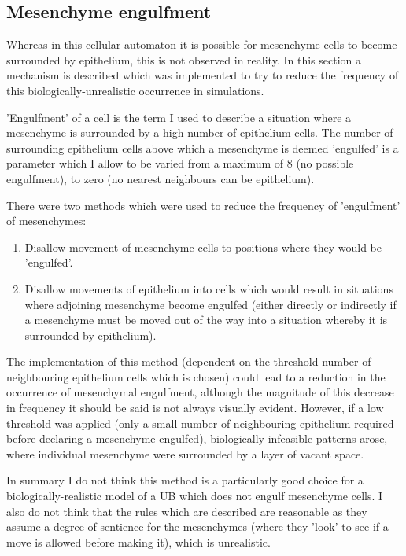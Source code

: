 \documentclass[pdftex,10pt,a4paper]{article}
\begin{document}
\subsection{Mesenchyme engulfment}\label{sec:engulfment}
Whereas in this cellular automaton it is possible for mesenchyme cells to become surrounded by epithelium, this is not observed in reality. In this section a mechanism is described which was implemented to try to reduce the frequency of this biologically-unrealistic occurrence in simulations.

'Engulfment' of a cell is the term I used to describe a situation where a mesenchyme is surrounded by a high number of epithelium cells. The number of surrounding epithelium cells above which a mesenchyme is deemed 'engulfed' is a parameter which I allow to be varied from a maximum of 8 (no possible engulfment), to zero (no nearest neighbours can be epithelium).

There were two methods which were used to reduce the frequency of 'engulfment' of mesenchymes:

\begin{enumerate}
\item Disallow movement of mesenchyme cells to positions where they would be 'engulfed'.
\item Disallow movements of epithelium into cells which would result in situations where adjoining mesenchyme become engulfed (either directly or indirectly if a mesenchyme must be moved out of the way into a situation whereby it is surrounded by epithelium).
\end{enumerate}

The implementation of this method (dependent on the threshold number of neighbouring epithelium cells which is chosen) could lead to a reduction in the occurrence of mesenchymal engulfment, although the magnitude of this decrease in frequency it should be said is not always visually evident. However, if a low threshold was applied (only a small number of neighbouring epithelium required before declaring a mesenchyme engulfed), biologically-infeasible patterns arose, where individual mesenchyme were surrounded by a layer of vacant space.

In summary I do not think this method is a particularly good choice for a biologically-realistic model of a UB which does not engulf mesenchyme cells. I also do not think that the rules which are described are reasonable as they assume a degree of sentience for the mesenchymes (where they 'look' to see if a move is allowed before making it), which is unrealistic.
\end{document}

